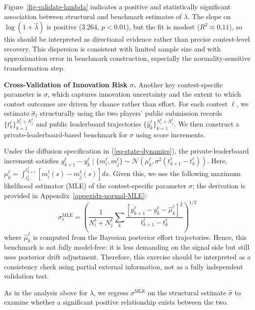 \documentclass[mnsc]{informs3}
\begin{document}
Figure~\ref{fig-validate-lambda} indicates a positive and statistically significant association between structural and benchmark estimates of $\lambda$.
The slope on $\log(1+\hat\lambda)$ is positive (3.264, $p<0.01$), but the fit is modest ($R^2\approx0.11$), so this should be interpreted as directional evidence rather than precise contest-level recovery.
This dispersion is consistent with limited sample size and with approximation error in benchmark construction, especially the normality-sensitive transformation step.




\textbf{Cross-Validation of Innovation Risk $\sigma$.}
Another key contest-specific parameter is $\sigma$, which captures innovation uncertainty and the extent to which contest outcomes are driven by chance rather than effort.
For each contest $\ell$, we estimate $\hat{\sigma}_\ell$ structurally using the two players’ public submission records $\{t_k^\ell\}_{k=1}^{N_i^\ell+N_j^\ell}$ and public leaderboard trajectories $\{\hat y_k^\ell\}_{k=1}^{N_i^\ell+N_j^\ell}$.
We then construct a private-leaderboard-based benchmark for $\sigma$ using score increments.

Under the diffusion specification in (\ref{eq-state-dynamics}), the private-leaderboard increment satisfies
$y^\ell_{k+1} - y^\ell_{k} \mid \{m_i^\ell,m_j^\ell\} \sim \mathcal{N}\left(\mu^\ell_k, \sigma^2(t^\ell_{k+1}-t^\ell_k)\right)$.
Here, $\mu^\ell_k = \int^{t^\ell_{k+1}}_{t^\ell_k}\left[m^\ell_i(s) - m^\ell_j(s)\right]ds$.
Given this, we use the following maximum likelihood estimator (MLE) of the contest-specific parameter $\sigma$; the derivation is provided in Appendix~\ref{appexidx-normal-MLE}:
\begin{equation*}
\sigma^{\text{MLE}}_\ell = \left(\frac{1}{N^\ell_i+N^\ell_j}\sum_k\frac{\left[y^\ell_{k+1}-y^\ell_{k}-\hat\mu^\ell_k\right]^2}{t^\ell_{k+1}-t^\ell_k}\right)^{1/2}
\end{equation*}
where $\hat\mu^\ell_k$ is computed from the Bayesian posterior effort trajectories.
Hence, this benchmark is not fully model-free: it is less demanding on the signal side but still uses posterior drift adjustment.
Therefore, this exercise should be interpreted as a consistency check using partial external information, not as a fully independent validation test.

As in the analysis above for $\lambda$, we regress $\sigma^{\text{MLE}}$ on the structural estimate $\hat{\sigma}$ to examine whether a significant positive relationship exists between the two.
\end{document}
